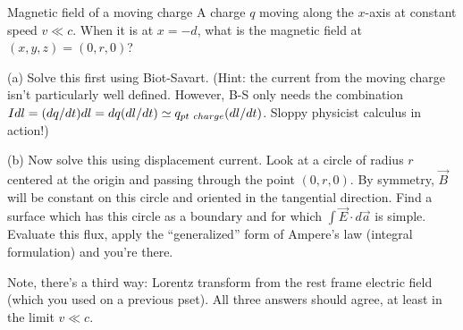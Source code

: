 \documentclass[makesolutionspdf]{esg8022pset}
\begin{document}
\begin{problem}{ Magnetic field of a moving charge}
A charge $q$ moving
along the $x$-axis at constant speed $v \ll c$.  When it is at $x =
-d$, what is the magnetic field at $(x,y,z) = (0,r,0)$?

\par\noindent (a)  Solve this first using Biot-Savart.  (Hint:
the current from the moving charge isn't particularly well defined.
However, B-S only needs the combination $I dl = (dq/dt) dl = dq
(dl/dt) \simeq q_{\rm pt\ charge}(dl/dt)$.  Sloppy physicist calculus
in action!)

\par\noindent (b)  Now solve this using displacement current.
Look at a circle of radius $r$ centered at the origin and passing
through the point $(0,r,0)$.  By symmetry, $\vec B$ will be constant
on this circle and oriented in the tangential direction.  Find a
surface which has this circle as a boundary and for which $\int \vec
E\cdot d\vec a$ is simple.  Evaluate this flux, apply the
``generalized'' form of Ampere's law (integral formulation) and you're
there.

\par\noindent Note, there's a third way: Lorentz transform from the
rest frame electric field (which you used on a previous pset).  All
three answers should agree, at least in the limit $v \ll c$.

\end{problem}
\end{document}
